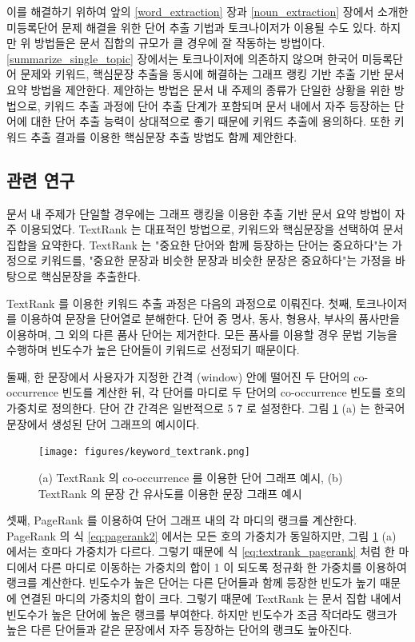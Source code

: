 \documentclass[11pt]{article}
\begin{document}
이를 해결하기 위하여 앞의 \ref{word_extraction} 장과 \ref{noun_extraction} 장에서 소개한 미등록단어 문제 해결을 위한 단어 추출 기법과 토크나이저가 이용될 수도 있다.
하지만 위 방법들은 문서 집합의 규모가 클 경우에 잘 작동하는 방법이다.
\ref{summarize_single_topic} 장에서는 토크나이저에 의존하지 않으며 한국어 미등록단어 문제와 키워드, 핵심문장 추출을 동시에 해결하는 그래프 랭킹 기반 추출 기반 문서 요약 방법을 제안한다.
제안하는 방법은 문서 내 주제의 종류가 단일한 상황을 위한 방법으로, 키워드 추출 과정에 단어 추출 단계가 포함되며 문서 내에서 자주 등장하는 단어에 대한 단어 추출 능력이 상대적으로 좋기 때문에 키워드 추출에 용의하다.
또한 키워드 추출 결과를 이용한 핵심문장 추출 방법도 함께 제안한다.

\subsection{관련 연구}

문서 내 주제가 단일할 경우에는 그래프 랭킹을 이용한 추출 기반 문서 요약 방법이 자주 이용되었다.
TextRank \citep{mihalcea2004textrank} 는 대표적인 방법으로, 키워드와 핵심문장을 선택하여 문서 집합을 요약한다.
TextRank 는 "중요한 단어와 함께 등장하는 단어는 중요하다"는 가정으로 키워드를, "중요한 문장과 비슷한 문장과 비슷한 문장은 중요하다"는 가정을 바탕으로 핵심문장을 추출한다.

TextRank 를 이용한 키워드 추출 과정은 다음의 과정으로 이뤄진다.
첫째, 토크나이저를 이용하여 문장을 단어열로 분해한다.
단어 중 명사, 동사, 형용사, 부사의 품사만을 이용하며, 그 외의 다른 품사 단어는 제거한다.
모든 품사를 이용할 경우 문법 기능을 수행하며 빈도수가 높은 단어들이 키워드로 선정되기 때문이다.

둘째, 한 문장에서 사용자가 지정한 간격 (window) 안에 떨어진 두 단어의 co-occurrence 빈도를 계산한 뒤, 각 단어를 마디로 두 단어의 co-occurrence 빈도를 호의 가중치로 정의한다.
단어 간 간격은 일반적으로 5 \~ 7 로 설정한다.
그림 \ref{fig:textrank} (a) 는 한국어 문장에서 생성된 단어 그래프의 예시이다.

\begin{figure}[H]
\centering
\texttt{[image: figures/keyword\_textrank.png]}
\caption{(a) TextRank 의 co-occurrence 를 이용한 단어 그래프 예시, (b) TextRank 의 문장 간 유사도를 이용한 문장 그래프 예시}
\label{fig:textrank}
\end{figure}

셋째, PageRank \citep{ilprints422} 를 이용하여 단어 그래프 내의 각 마디의 랭크를 계산한다.
PageRank 의 식 \ref{eq:pagerank2} 에서는 모든 호의 가중치가 동일하지만, 그림 \ref{fig:textrank} (a) 에서는 호마다 가중치가 다르다.
그렇기 때문에 식 \ref{eq:textrank_pagerank} 처럼 한 마디에서 다른 마디로 이동하는 가중치의 합이 1 이 되도록 정규화 한 가중치를 이용하여 랭크를 계산한다.
빈도수가 높은 단어는 다른 단어들과 함께 등장한 빈도가 높기 때문에 연결된 마디의 가중치의 합이 크다.
그렇기 때문에 TextRank 는 문서 집합 내에서 빈도수가 높은 단어에 높은 랭크를 부여한다.
하지만 빈도수가 조금 작더라도 랭크가 높은 다른 단어들과 같은 문장에서 자주 등장하는 단어의 랭크도 높아진다.
\end{document}
